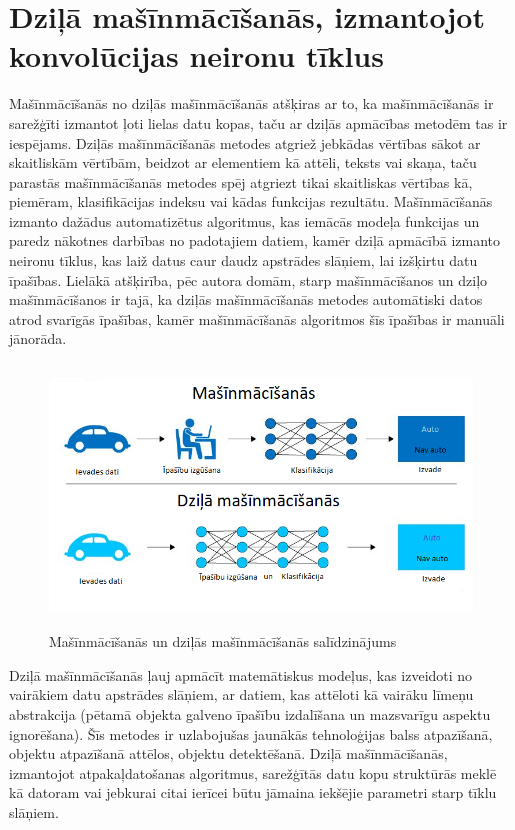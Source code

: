 \section{Dziļā mašīnmācīšanās, izmantojot konvolūcijas neironu tīklus}
Mašīnmācīšanās no dziļās mašīnmācīšanās atšķiras ar to, ka mašīnmācīšanās ir sarežģīti izmantot ļoti lielas datu kopas, taču ar dziļās apmācības metodēm tas ir iespējams. Dziļās mašīnmācīšanās metodes atgriež jebkādas vērtības sākot ar skaitliskām vērtībām, beidzot ar elementiem kā attēli, teksts vai skaņa, taču parastās mašīnmācīšanās metodes spēj atgriezt tikai skaitliskas vērtības kā, piemēram, klasifikācijas indeksu vai kādas funkcijas rezultātu. Mašīnmācīšanās izmanto dažādus automatizētus algoritmus, kas iemācās modeļa funkcijas un paredz nākotnes darbības no padotajiem datiem, kamēr dziļā apmācībā izmanto neironu tīklus, kas laiž datus caur daudz apstrādes slāņiem, lai izšķirtu datu īpašības. Lielākā atšķirība, pēc autora domām, starp mašīnmācīšanos un dziļo mašīnmācīšanos ir tajā, ka dziļās mašīnmācīšanās metodes automātiski datos atrod svarīgās īpašības, kamēr mašīnmācīšanās algoritmos šīs īpašības ir manuāli jānorāda. 
\begin{figure}[h]%
	\centering
	\includegraphics[height=7cm]{images/deeplearning.png} %
	\caption{Mašīnmācīšanās un dziļās mašīnmācīšanās salīdzinājums}%
	\label{fig:example}%
\end{figure}

Dziļā mašīnmācīšanās ļauj apmācīt matemātiskus modeļus, kas izveidoti no vairākiem datu apstrādes slāņiem, ar datiem, kas attēloti kā vairāku līmeņu abstrakcija (pētamā objekta galveno īpašību izdalīšana un mazsvarīgu aspektu ignorēšana). Šīs metodes ir uzlabojušas jaunākās tehnoloģijas balss atpazīšanā, objektu atpazīšanā attēlos, objektu detektēšanā. Dziļā mašīnmācīšanās, izmantojot atpakaļdatošanas algoritmus, sarežģītās datu kopu struktūrās meklē kā datoram vai jebkurai citai ierīcei būtu jāmaina iekšējie parametri starp tīklu slāņiem.

